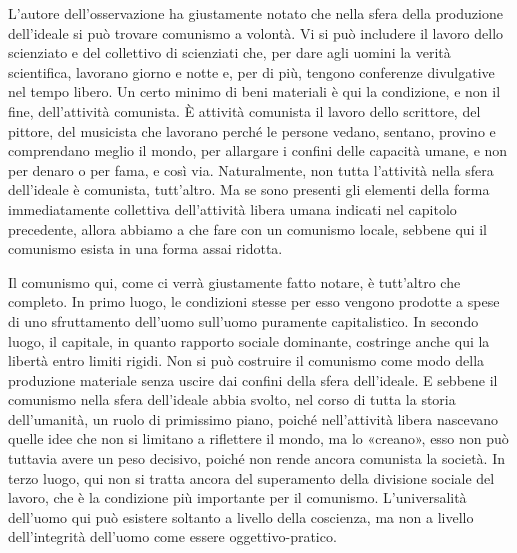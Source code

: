 \documentclass[../main]{subfiles}
\begin{document}
L'autore dell'osservazione ha giustamente notato che nella sfera della produzione dell'ideale si può trovare comunismo a volontà. Vi si può includere il lavoro dello scienziato e del collettivo di scienziati che, per dare agli uomini la verità scientifica, lavorano giorno e notte e, per di più, tengono conferenze divulgative nel tempo libero. Un certo minimo di beni materiali è qui la condizione, e non il fine, dell'attività comunista. È attività comunista il lavoro dello scrittore, del pittore, del musicista che lavorano perché le persone vedano, sentano, provino e comprendano meglio il mondo, per allargare i confini delle capacità umane, e non per denaro o per fama, e così via. Naturalmente, non tutta l'attività nella sfera dell'ideale è comunista, tutt'altro. Ma se sono presenti gli elementi della forma immediatamente collettiva dell'attività libera umana indicati nel capitolo precedente, allora abbiamo a che fare con un comunismo locale, sebbene qui il comunismo esista in una forma assai ridotta.

Il comunismo qui, come ci verrà giustamente fatto notare, è tutt'altro che completo. In primo luogo, le condizioni stesse per esso vengono prodotte a spese di uno sfruttamento dell'uomo sull'uomo puramente capitalistico. In secondo luogo, il capitale, in quanto rapporto sociale dominante, costringe anche qui la libertà entro limiti rigidi. Non si può costruire il comunismo come modo della produzione materiale senza uscire dai confini della sfera dell'ideale. E sebbene il comunismo nella sfera dell'ideale abbia svolto, nel corso di tutta la storia dell'umanità, un ruolo di primissimo piano, poiché nell'attività libera nascevano quelle idee che non si limitano a riflettere il mondo, ma lo «creano», esso non può tuttavia avere un peso decisivo, poiché non rende ancora comunista la società. In terzo luogo, qui non si tratta ancora del superamento della divisione sociale del lavoro, che è la condizione più importante per il comunismo. L'universalità dell'uomo qui può esistere soltanto a livello della coscienza, ma non a livello dell'integrità dell'uomo come essere oggettivo-pratico.
\end{document}

